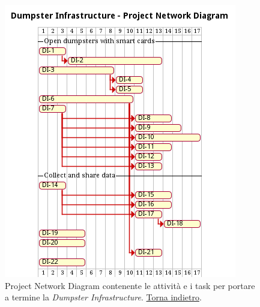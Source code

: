 \begin{figure}[H]
    \centering
    \includegraphics[width=\textwidth]{img/gantt-dumpster-infrastructure.pm}
    \caption{Project Network Diagram contenente le attività e i task per portare a termine la \textit{Dumpster Infrastructure}. \hyperlink{back:gantt-dumpster-infrastructure}{Torna indietro}.}
    \label{fig:gantt-dumpster-infrastructure}
\end{figure}

